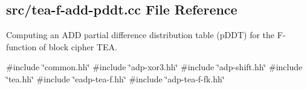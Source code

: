 \hypertarget{tea-f-add-pddt_8cc}{\subsection{src/tea-\/f-\/add-\/pddt.cc \-File \-Reference}
\label{tea-f-add-pddt_8cc}
}


\-Computing an \-A\-D\-D partial difference distribution table (p\-D\-D\-T) for the \-F-\/function of block cipher \-T\-E\-A.  


{\ttfamily \#include \char`\"{}common.\-hh\char`\"{}}\*
{\ttfamily \#include \char`\"{}adp-\/xor3.\-hh\char`\"{}}\*
{\ttfamily \#include \char`\"{}adp-\/shift.\-hh\char`\"{}}\*
{\ttfamily \#include \char`\"{}tea.\-hh\char`\"{}}\*
{\ttfamily \#include \char`\"{}eadp-\/tea-\/f.\-hh\char`\"{}}\*
{\ttfamily \#include \char`\"{}adp-\/tea-\/f-\/fk.\-hh\char`\"{}}\*
